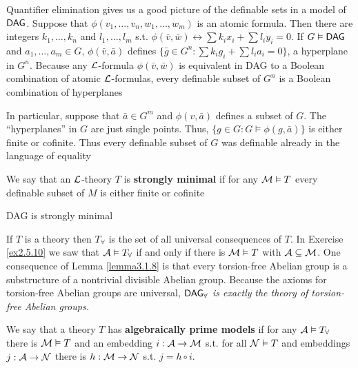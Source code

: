 \documentclass[11pt]{article}
\begin{document}
Quantifier elimination gives us a good picture of the definable sets in
a model of \(\operatorname{\textsf{DAG}}\). Suppose that \(\phi(v_1,\dots,v_n,w_1,\dots,w_m)\) is an atomic
formula. Then there are integers \(k_1,\dots,k_n\) and \(l_1,\dots,l_m\) s.t.
\(\phi(\bar{v},\bar{w})\leftrightarrow\sum k_ix_i+\sum l_iy_i=0\). If \(G\vDash\operatorname{\textsf{DAG}}\) and
\(a_1,\dots,a_m\in G\), \(\phi(\bar{v},\bar{a})\) defines
\(\{\bar{g}\in G^n:\sum k_ig_i+\sum l_ia_i=0\}\), a hyperplane in \(G^n\). Because
any \(\mathcal{L}\)-formula \(\phi(\bar{v},\bar{w})\) is equivalent in DAG to a
Boolean combination of atomic \(\mathcal{L}\)-formulas, every definable subset of
\(G^n\) is a Boolean combination of hyperplanes

In particular, suppose that \(\bar{a}\in G^m\) and \(\phi(v,\bar{a})\) defines a
subset of \(G\). The ``hyperplanes'' in \(G\) are just single points. Thus,
\(\{g\in G:G\vDash\phi(g,\bar{a})\}\) is either finite or cofinite. Thus
every definable subset of \(G\) was definable already in the language of equality

\begin{definition}[]
We say that an \(\mathcal{L}\)-theory \(T\) is \textbf{strongly minimal} if for any
\(\mathcal{M}\vDash T\) every definable subset of \(M\) is either finite or cofinite
\end{definition}

\begin{corollary}[]
DAG is strongly minimal
\end{corollary}


If \(T\) is a theory then \(T_\forall\) is the set of all universal consequences
of \(T\). In Exercise \ref{ex2.5.10} we saw that \(\mathcal{A}\vDash T_\forall\) if and
only if there is \(\mathcal{M}\vDash T\) with \(\mathcal{A}\subseteq\mathcal{M}\). One
consequence of Lemma \ref{lemma3.1.8} is that every torsion-free Abelian group
is a substructure of a nontrivial divisible Abelian group. Because the
axioms for torsion-free Abelian groups are universal, \emph{\(\operatorname{\textsf{DAG}}_\forall\) is exactly}
\emph{the theory of torsion-free Abelian groups.}

We say that a theory \(T\) has \textbf{algebraically prime models} if for any
\(\mathcal{A}\vDash T_\forall\) there is \(\mathcal{M}\vDash T\) and an embedding
\(i:\mathcal{A}\to\mathcal{M}\) s.t. for all \(\mathcal{N}\vDash T\) and embeddings
\(j:\mathcal{A}\to\mathcal{N}\) there is \(h:\mathcal{M}\to\mathcal{N}\) s.t. \(j=h\circ i\).
\begin{center}
\end{center}
\end{document}
